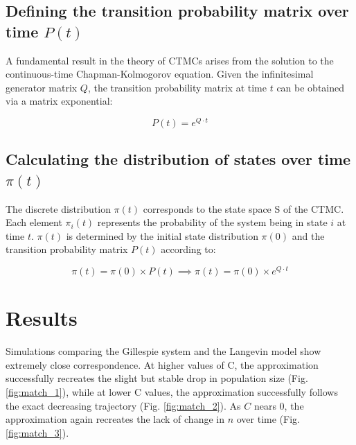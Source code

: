 \documentclass[]{article}
\begin{document}
\subsection{Defining the transition probability matrix over time $P(t)$}

A fundamental result in the theory of CTMCs arises from the solution to the continuous-time Chapman-Kolmogorov equation. Given the infinitesimal generator matrix $Q$, the transition probability matrix at time $t$ can be obtained via a matrix exponential:

\begin{equation}	
	P(t) = e^{Q \cdot t}
\end{equation}
 
\subsection{Calculating the distribution of states over time $\pi(t)$}

The discrete distribution $\pi(t)$ corresponds to the state space S of the CTMC. Each element $\pi_i(t)$ represents the probability of the system being in state $i$ at time $t$. $\pi(t)$ is determined by the initial state distribution $\pi(0)$ and the transition probability matrix $P(t)$ according to:

\begin{equation}
	\pi(t) = \pi(0) \times P(t) \implies \pi(t) =  \pi(0) \times e^{Q \cdot t}
\end{equation}



\section{Results}

Simulations comparing the Gillespie system and the Langevin model show extremely close correspondence. At higher values of C, the approximation successfully recreates the slight but stable drop in population size (Fig. \ref{fig:match_1}), while at lower C values, the approximation successfully follows the exact decreasing trajectory (Fig. \ref{fig:match_2}). As $C$ nears 0, the approximation again recreates the lack of change in $n$ over time (Fig. \ref{fig:match_3}). 
\end{document}
